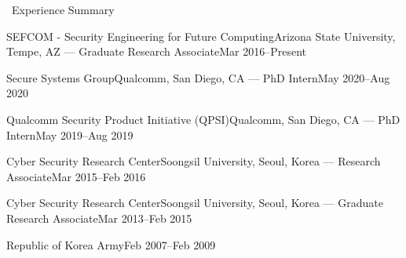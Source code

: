\documentclass{resume} %
\begin{document}

\begin{rSection}{\faGenderless~Experience Summary}

	\begin{rSubsection2}
		{SEFCOM - {\small Security Engineering for Future Computing}}{Arizona State University, Tempe, AZ}
		{--- Graduate Research Associate}{Mar 2016--Present}
	\end{rSubsection2}
    \vspace{-3mm}

    \begin{rSubsection2}
        {Secure Systems Group}{Qualcomm, San Diego, CA}
        {--- PhD Intern}{May 2020--Aug 2020}
    \end{rSubsection2}
    \vspace{-3mm}

    \begin{rSubsection2}
        {Qualcomm Security Product Initiative (QPSI)}{Qualcomm, San Diego, CA}
        {--- PhD Intern}{May 2019--Aug 2019}
    \end{rSubsection2}
    \vspace{-3mm}

	\begin{rSubsection2}
		{Cyber Security Research Center}{Soongsil University, Seoul, Korea}
		{--- Research Associate}{Mar 2015--Feb 2016}
	\end{rSubsection2}
	\vspace{-3mm}
	\begin{rSubsection2}
		{Cyber Security Research Center}{Soongsil University, Seoul, Korea}
		{--- Graduate Research Associate}{Mar 2013--Feb 2015}
	\end{rSubsection2}
	\vspace{-3mm}

	\begin{rSubsection2}
		{Republic of Korea Army}{Feb 2007--Feb 2009}
		{}{}
	\end{rSubsection2}

\end{rSection}

\end{document}

